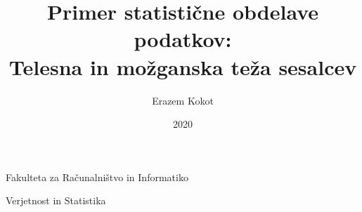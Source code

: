 \documentclass[12pt,a4paper]{article}
\title{Primer statistične obdelave podatkov:\\ Telesna in možganska teža sesalcev}
\author{Erazem Kokot}
\date{2020}
\begin{document}
    \begin{titlepage}
        \maketitle

        \vfill
        \begin{center}
            Fakulteta za Računalništvo in Informatiko

            Verjetnost in Statistika
        \end{center}
        \thispagestyle{empty}
    \end{titlepage}
    

    \tableofcontents

    \renewcommand{\listtablename}{Kazalo tabel}
    \listoftables

    \renewcommand{\listfigurename}{Kazalo grafov}
    \listoffigures
    \thispagestyle{empty}

    \newpage

    

    
    \newpage
    
    \newpage
    
    \newpage
    
    \newpage
    
    \newpage
    
    \newpage
    
    \newpage
    
    \newpage
    
\end{document}
